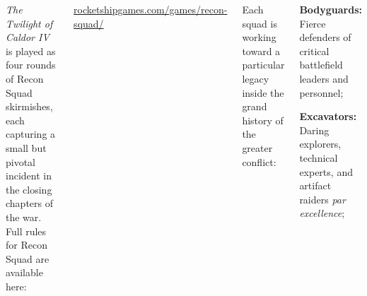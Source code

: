 \begin{columns}
\columnbreak
\noindent{}


\emph{The Twilight of Caldor IV} is played as four rounds of Recon
Squad skirmishes, each capturing a small but pivotal incident in the
closing chapters of the war.  Full rules for Recon Squad are available
here:

\centerline{\url{rocketshipgames.com/games/recon-squad/}}

\smallskip%
Each squad is working toward a particular legacy inside the grand
history of the greater conflict:

\begin{squishitemize}
\item \textbf{Bodyguards:} Fierce defenders of critical battlefield
  leaders and personnel;

\item \textbf{Excavators:} Daring explorers, technical experts, and
  artifact raiders \emph{par excellence};


\end{squishitemize}
\end{columns}
